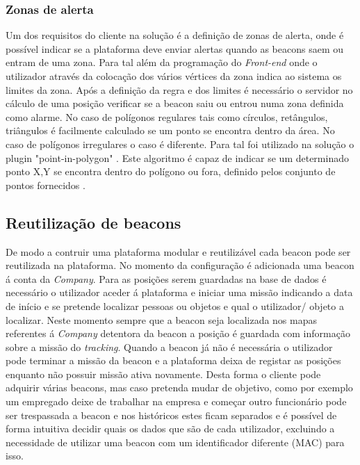 \subsubsection{Zonas de alerta}

\par Um dos requisitos do cliente na solução é a definição de zonas de alerta, onde é possível indicar se a plataforma deve enviar alertas quando as beacons saem ou entram de uma zona. Para tal além da programação do \textit{Front-end} onde o utilizador através da colocação dos vários vértices da zona indica ao sistema os limites da zona. Após a definição da regra e dos limites é necessário o servidor no cálculo de uma posição verificar se a beacon saiu ou entrou numa zona definida como alarme. No caso de polígonos regulares tais como círculos, retângulos, triângulos é facilmente calculado se um ponto se encontra dentro da área. No caso de polígonos irregulares o caso é diferente. Para tal foi utilizado na solução o plugin "point-in-polygon" \cite {pointpoint}. Este algoritmo é capaz de indicar se um determinado ponto X,Y se encontra dentro do polígono ou fora, definido pelos conjunto de pontos fornecidos .

\subsection{Reutilização de beacons}

\par De modo a contruir uma plataforma modular e reutilizável cada beacon pode ser reutilizada na plataforma. No momento da configuração é adicionada uma beacon á conta da \textit{Company}. Para as posições serem guardadas na base de dados é necessário o utilizador aceder á plataforma e iniciar uma missão indicando a data de início e se pretende localizar pessoas ou objetos e qual o utilizador/ objeto a localizar. Neste momento sempre que a beacon seja localizada nos mapas referentes á \textit{Company} detentora da beacon a posição é guardada com informação sobre a missão do \textit{tracking}. Quando a beacon já não é necessária o utilizador pode terminar a missão da beacon e a plataforma deixa de registar as posições enquanto não possuir missão ativa novamente. Desta forma o cliente pode adquirir várias beacons, mas caso pretenda mudar de objetivo, como por exemplo um empregado deixe de trabalhar na empresa e começar outro funcionário pode ser trespassada a beacon e nos históricos estes ficam separados e é possível de forma intuitiva decidir quais os dados que são de cada utilizador, excluindo a necessidade de utilizar uma beacon com um identificador diferente (MAC) para isso.
\par
